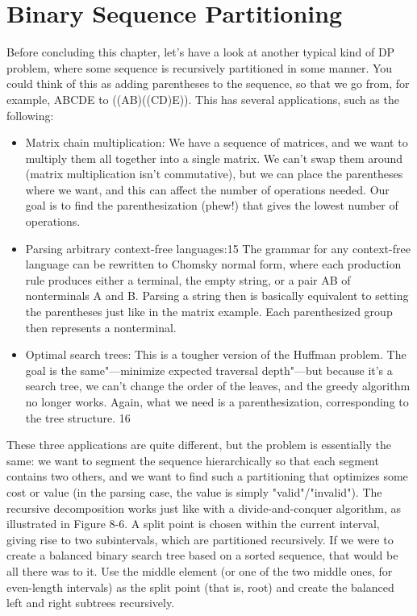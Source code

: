 \section{Binary Sequence Partitioning}
Before concluding this chapter, let's have a look at another typical kind of DP problem, where some sequence is recursively partitioned in some manner. You could think of this as adding parentheses to the sequence, so that we go from, for example, ABCDE to ((AB)((CD)E)). This has several applications, such as the following:
\begin{itemize}
\item Matrix chain multiplication: We have a sequence of matrices, and we want to multiply them all together into a single matrix. We can't swap them around (matrix multiplication isn't commutative), but we can place the parentheses where we want, and this can affect the number of operations needed. Our goal is to find the parenthesization (phew!) that gives the lowest number of operations.
\item Parsing arbitrary context-free languages:15 The grammar for any context-free language can be rewritten to Chomsky normal form, where each production rule produces either a terminal, the empty string, or a pair AB of nonterminals A and B. Parsing a string then is basically equivalent to setting the parentheses just like in the matrix example. Each parenthesized group then represents a nonterminal.
\item Optimal search trees: This is a tougher version of the Huffman problem. The goal is the same"---minimize expected traversal depth"---but because it's a search tree, we can't change the order of the leaves, and the greedy algorithm no longer works. Again, what we need is a parenthesization, corresponding to the tree structure. 16
\end{itemize}

These three applications are quite different, but the problem is essentially the same: we want to
segment the sequence hierarchically so that each segment contains two others, and we want to find such a partitioning that optimizes some cost or value (in the parsing case, the value is simply
"valid"/"invalid"). The recursive decomposition works just like with a divide-and-conquer algorithm, as illustrated in Figure 8-6. A split point is chosen within the current interval, giving rise to two subintervals, which are partitioned recursively. If we were to create a balanced binary search tree based on a sorted sequence, that would be all there was to it. Use the middle element (or one of the two middle ones, for even-length intervals) as the split point (that is, root) and create the balanced left and right subtrees recursively.

